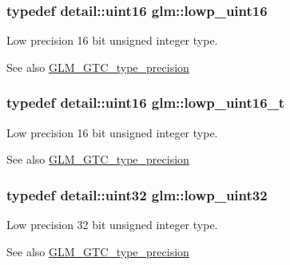 \subsubsection[{\texorpdfstring{lowp\+\_\+uint16}{lowp_uint16}}]{\setlength{\rightskip}{0pt plus 5cm}typedef detail\+::uint16 {\bf glm\+::lowp\+\_\+uint16}}\hypertarget{group__gtc__type__precision_ga9b8409887319f62f06e664f6ca121b9d}{}\label{group__gtc__type__precision_ga9b8409887319f62f06e664f6ca121b9d}
Low precision 16 bit unsigned integer type. \begin{DoxySeeAlso}{See also}
\hyperlink{group__gtc__type__precision}{G\+L\+M\+\_\+\+G\+T\+C\+\_\+type\+\_\+precision} 
\end{DoxySeeAlso}
\subsubsection[{\texorpdfstring{lowp\+\_\+uint16\+\_\+t}{lowp_uint16_t}}]{\setlength{\rightskip}{0pt plus 5cm}typedef detail\+::uint16 {\bf glm\+::lowp\+\_\+uint16\+\_\+t}}\hypertarget{group__gtc__type__precision_ga9a71176a4e5bc61951f9e9197d9c80e1}{}\label{group__gtc__type__precision_ga9a71176a4e5bc61951f9e9197d9c80e1}
Low precision 16 bit unsigned integer type. \begin{DoxySeeAlso}{See also}
\hyperlink{group__gtc__type__precision}{G\+L\+M\+\_\+\+G\+T\+C\+\_\+type\+\_\+precision} 
\end{DoxySeeAlso}
\subsubsection[{\texorpdfstring{lowp\+\_\+uint32}{lowp_uint32}}]{\setlength{\rightskip}{0pt plus 5cm}typedef detail\+::uint32 {\bf glm\+::lowp\+\_\+uint32}}\hypertarget{group__gtc__type__precision_gaf11e85af414720b4cd12bd57b3a81e68}{}\label{group__gtc__type__precision_gaf11e85af414720b4cd12bd57b3a81e68}
Low precision 32 bit unsigned integer type. \begin{DoxySeeAlso}{See also}
\hyperlink{group__gtc__type__precision}{G\+L\+M\+\_\+\+G\+T\+C\+\_\+type\+\_\+precision} 
\end{DoxySeeAlso}
